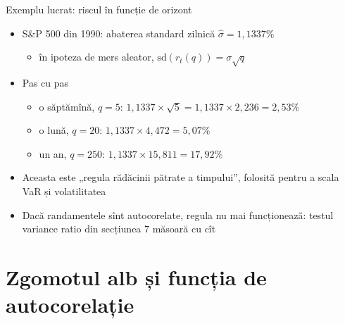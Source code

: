 \begin{frame}{Exemplu lucrat: riscul în funcție de orizont}
\itemsize{\small}
\begin{itemize}
    \item S\&P 500 din 1990: abaterea standard zilnică $\hat\sigma = 1{,}1337\%$
    \begin{itemize}
        \item în ipoteza de mers aleator, $\mathrm{sd}(r_t(q)) = \sigma\sqrt{q}$
    \end{itemize}
    \item Pas cu pas
    \begin{itemize}
        \item o săptămînă, $q = 5$: $1{,}1337 \times \sqrt{5} = 1{,}1337 \times 2{,}236 = 2{,}53\%$
        \item o lună, $q = 20$: $1{,}1337 \times 4{,}472 = 5{,}07\%$
        \item un an, $q = 250$: $1{,}1337 \times 15{,}811 = 17{,}92\%$
    \end{itemize}
    \item Aceasta este „regula rădăcinii pătrate a timpului”, folosită pentru a scala VaR și volatilitatea
    \item Dacă randamentele sînt autocorelate, regula nu mai funcționează: testul variance ratio din secțiunea 7 măsoară cu cît
\end{itemize}
\end{frame}


\section{Zgomotul alb și funcția de autocorelație}

